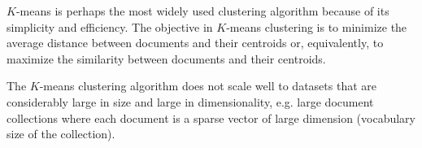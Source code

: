 \documentclass[runningheads]{llncs}
\begin{document}
$K$-means is perhaps the most widely used clustering algorithm
because of its simplicity and efficiency. The objective in $K$-means clustering is to minimize the average distance between documents and their
centroids or, equivalently, to maximize the similarity between documents
and their centroids.



The $K$-means clustering algorithm
does not scale well to datasets that are considerably large in size
and large in dimensionality, e.g. large document collections where
each document is a sparse vector of large dimension (vocabulary
size of the collection).

\end{document}
